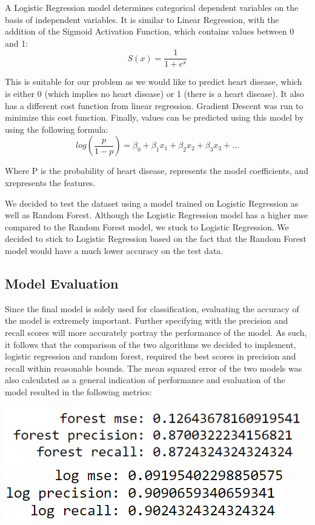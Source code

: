 \documentclass[12pt]{article}
\begin{document}
A Logistic Regression model determines categorical dependent variables on the basis of independent variables. It is similar to Linear Regression, with the addition of the Sigmoid Activation Function, which contains values between 0 and 1: 
$$S(x) = \frac{1}{1+e^x}$$
\par This is suitable for our problem as we would like to predict heart disease, which is either 0 (which implies no heart disease) or 1 (there is a heart disease). It also has a different cost function from linear regression. Gradient Descent was run to minimize this cost function. Finally, values can be predicted using this model by using the following formula:
$$log(\frac{p}{1-p}) = \beta_0 + \beta_1x_1 + \beta_2x_2 + \beta_3x_3 + \dots$$
\par Where P is the probability of heart disease, represents the model coefficients, and xrepresents the features.

We decided to test the dataset using a model trained on Logistic Regression as well as Random Forest. Although the Logistic Regression model has a higher mse compared to the Random Forest model, we stuck to Logistic Regression. We decided to stick to Logistic Regression based on the fact that the Random Forest model would have a much lower accuracy on the test data.


\subsection*{Model Evaluation}
\hspace{\parindent} Since the final model is solely used for classification, evaluating the accuracy of the model is extremely important. Further specifying with the precision and recall scores will more accurately portray the performance of the model. As such, it follows that the comparison of the two algorithms we decided to implement, logistic regression and random forest, required the best scores in precision and recall within reasonable bounds. The mean squared error of the two models was also calculated as a general indication of performance and evaluation of the model resulted in the following metrics:

\begin{center}
        \includegraphics[width=\textwidth, height=\textheight, keepaspectratio]{images/image3.png}
        \includegraphics[width=\textwidth, height=\textheight, keepaspectratio]{images/image4.png}
\end{center}
\end{document}
